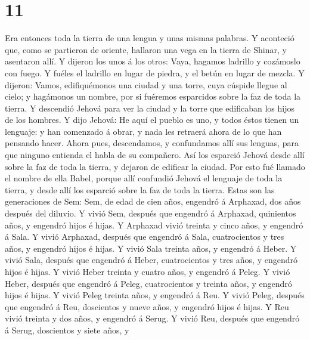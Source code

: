 \hypertarget{section-10}{%
\section{11}\label{section-10}}

 Era entonces toda la tierra de una lengua y unas mismas
palabras.  Y aconteció que, como se partieron de oriente,
hallaron una vega en la tierra de Shinar, y asentaron allí.
 Y dijeron los unos á los otros: Vaya, hagamos ladrillo y
cozámoslo con fuego. Y fuéles el ladrillo en lugar de piedra, y el betún
en lugar de mezcla.  Y dijeron: Vamos, edifiquémonos una
ciudad y una torre, cuya cúspide llegue al cielo; y hagámonos un nombre,
por si fuéremos esparcidos sobre la faz de toda la tierra.
 Y descendió Jehová para ver la ciudad y la torre que
edificaban los hijos de los hombres.  Y dijo Jehová: He
aquí el pueblo es uno, y todos éstos tienen un lenguaje: y han comenzado
á obrar, y nada les retraerá ahora de lo que han pensando hacer.
 Ahora pues, descendamos, y confundamos allí sus lenguas,
para que ninguno entienda el habla de su compañero.  Así
los esparció Jehová desde allí sobre la faz de toda la tierra, y dejaron
de edificar la ciudad.  Por esto fué llamado el nombre de
ella Babel, porque allí confundió Jehová el lenguaje de toda la tierra,
y desde allí los esparció sobre la faz de toda la tierra.
 Estas son las generaciones de Sem: Sem, de edad de cien
años, engendró á Arphaxad, dos años después del diluvio. 
Y vivió Sem, después que engendró á Arphaxad, quinientos años, y
engendró hijos é hijas.  Y Arphaxad vivió treinta y cinco
años, y engendró á Sala.  Y vivió Arphaxad, después que
engendró á Sala, cuatrocientos y tres años, y engendró hijos é hijas.
 Y vivió Sala treinta años, y engendró á Heber.
 Y vivió Sala, después que engendró á Heber,
cuatrocientos y tres años, y engendró hijos é hijas.  Y
vivió Heber treinta y cuatro años, y engendró á Peleg.  Y
vivió Heber, después que engendró á Peleg, cuatrocientos y treinta años,
y engendró hijos é hijas.  Y vivió Peleg treinta años, y
engendró á Reu.  Y vivió Peleg, después que engendró á
Reu, doscientos y nueve años, y engendró hijos é hijas. 
Y Reu vivió treinta y dos años, y engendró á Serug.  Y
vivió Reu, después que engendró á Serug, doscientos y siete años, y
